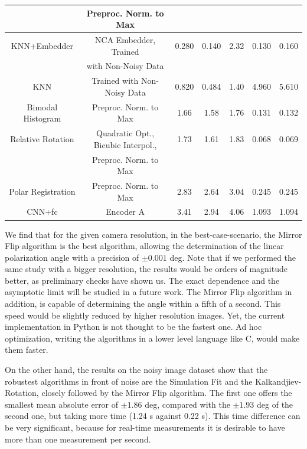\documentclass[11pt, a4paper, twoside]{article} %
\begin{document}
\begin{table}[h!]
{\begin{tabular}{c|c|c|cc|cc}
           &  Preproc. Norm. to Max & & & & \\ \hline
           \rule{0pt}{4mm}{}
          KNN+Embedder &              NCA Embedder, Trained  & 0.280 &    0.140 &   2.32 &        0.130 &       0.160 \\
                       &                 with Non-Noisy Data &         &            &           &              &             \\ \hline\rule{0pt}{4mm}{}
                   KNN &         Trained with Non-Noisy Data & 0.820&    0.484 &   1.40 &        4.960 &       5.610 \\ \hline\rule{0pt}{4mm}{}
     Bimodal Histogram &               Preproc. Norm. to Max & 1.66 &    1.58 &   1.76 &        0.131 &       0.132 \\ \hline\rule{0pt}{4mm}{}
     Relative Rotation & Quadratic Opt., Bicubic Interpol.,  & 1.73 &    1.61 &   1.83 &        0.068 &       0.069 \\
                       &               Preproc. Norm. to Max &         &            &           &              &             \\ \hline\rule{0pt}{4mm}{}
    Polar Registration &               Preproc. Norm. to Max & 2.83 &    2.64 &   3.04 &        0.245 &       0.245 \\ \hline\rule{0pt}{4mm}{}
                CNN+fc &                           Encoder A & 3.41 &    2.94 &   4.06 &        1.093 &       1.094 \\
\bottomrule
\end{tabular}
}
\end{table}



We find that for the given camera resolution, in the best-case-scenario, the Mirror Flip algorithm is the best algorithm, allowing the determination of the linear polarization angle with a precision of $\pm 0.001$ deg. Note that if we performed the same study with a bigger resolution, the results would be orders of magnitude better, as preliminary checks have shown us. The exact dependence and the asymptotic limit will be studied in a future work. The Mirror Flip algorithm in addition, is capable of determining the angle within a fifth of a second. This speed would be slightly reduced by higher resolution images. Yet, the current implementation in Python is not thought to be the fastest one. Ad hoc optimization, writing the algorithms in a lower level language like C, would make them faster.

On the other hand, the results on the noisy image dataset show that the robustest algorithms in front of noise are the Simulation Fit and the Kalkandjiev-Rotation, closely followed by the Mirror Flip algorithm. The first one offers the smallest mean absolute error of $\pm 1.86$ deg, compared with the $\pm 1.93$ deg of the second one, but taking more time (1.24 s against 0.22 s). This time difference can be very significant, because for real-time measurements it is desirable to have more than one measurement per second.
\end{document}
